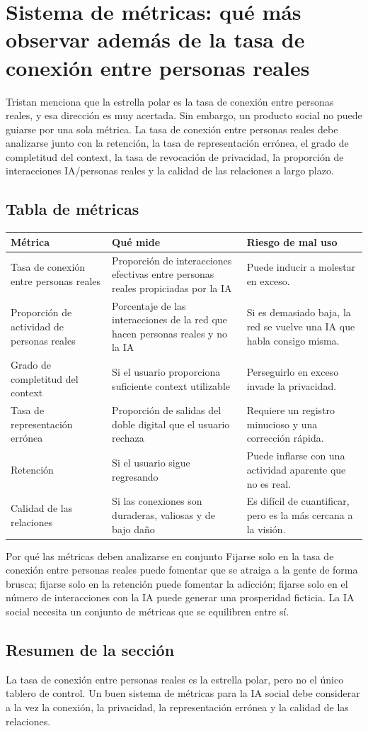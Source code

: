 \section{Sistema de métricas: qué más observar además de la tasa de conexión entre personas reales}

Tristan menciona que la estrella polar es la tasa de conexión entre personas reales, y esa dirección es muy acertada. Sin embargo, un producto social no puede guiarse por una sola métrica. La tasa de conexión entre personas reales debe analizarse junto con la retención, la tasa de representación errónea, el grado de completitud del context, la tasa de revocación de privacidad, la proporción de interacciones IA/personas reales y la calidad de las relaciones a largo plazo.

\subsection{Tabla de métricas}

\noindent\begin{longtable}{p{}p{}p{}}
\toprule
Métrica & Qué mide & Riesgo de mal uso \\
\midrule
Tasa de conexión entre personas reales & Proporción de interacciones efectivas entre personas reales propiciadas por la IA & Puede inducir a molestar en exceso. \\
Proporción de actividad de personas reales & Porcentaje de las interacciones de la red que hacen personas reales y no la IA & Si es demasiado baja, la red se vuelve una IA que habla consigo misma. \\
Grado de completitud del context & Si el usuario proporciona suficiente context utilizable & Perseguirlo en exceso invade la privacidad. \\
Tasa de representación errónea & Proporción de salidas del doble digital que el usuario rechaza & Requiere un registro minucioso y una corrección rápida. \\
Retención & Si el usuario sigue regresando & Puede inflarse con una actividad aparente que no es real. \\
Calidad de las relaciones & Si las conexiones son duraderas, valiosas y de bajo daño & Es difícil de cuantificar, pero es la más cercana a la visión. \\
\bottomrule
\end{longtable}

\begin{knowledgebox}{Por qué las métricas deben analizarse en conjunto}
Fijarse solo en la tasa de conexión entre personas reales puede fomentar que se atraiga a la gente de forma brusca; fijarse solo en la retención puede fomentar la adicción; fijarse solo en el número de interacciones con la IA puede generar una prosperidad ficticia. La IA social necesita un conjunto de métricas que se equilibren entre sí.
\end{knowledgebox}

\subsection{Resumen de la sección}

La tasa de conexión entre personas reales es la estrella polar, pero no el único tablero de control. Un buen sistema de métricas para la IA social debe considerar a la vez la conexión, la privacidad, la representación errónea y la calidad de las relaciones.
